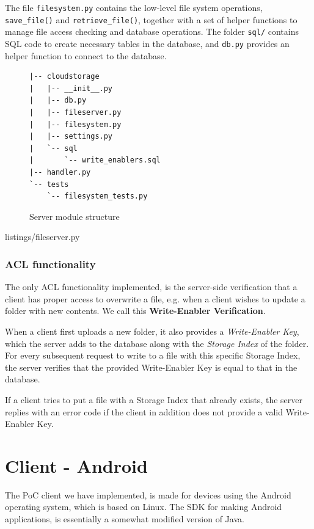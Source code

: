\documentclass[pdftex,english,10pt,b5paper,twoside]{book}
\begin{document}
The file \texttt{filesystem.py} contains the low-level file system operations,
\texttt{save\_file()} and \texttt{retrieve\_file()}, together with a set of
helper functions to manage file access checking and database operations.  The
folder \texttt{sql/} contains \ac{SQL} code to create necessary tables in the
database, and \texttt{db.py} provides an helper function to connect to the
database.

\begin{figure}[h!]
\begin{verbatim}
|-- cloudstorage
|   |-- __init__.py
|   |-- db.py
|   |-- fileserver.py
|   |-- filesystem.py
|   |-- settings.py
|   `-- sql
|       `-- write_enablers.sql
|-- handler.py
`-- tests
    `-- filesystem_tests.py
\end{verbatim}
    \caption{Server module structure}
    \label{fig:IM:layout}
\end{figure}


{listings/fileserver.py}

\subsubsection{\acs{ACL} functionality}

The only \ac{ACL} functionality implemented, is the server-side verification
that a client has proper access to overwrite a file, e.g. when a client wishes to
update a folder with new contents. We call this \textbf{Write-Enabler Verification}. 

When a client first uploads a new folder, it also provides a
\emph{Write-Enabler Key}, which the server adds to the database along with the
\emph{Storage Index} of the folder.  For every subsequent request to write to a
file with this specific Storage Index, the server verifies that the provided
Write-Enabler Key is equal to that in the database.

If a client tries to put a file with a Storage Index that already exists, the
server replies with an error code if the client in addition does not provide a
valid Write-Enabler Key.

\section{Client - Android}
%
The \ac{PoC} client we have implemented, is made for devices using the Android
operating system, which is based on Linux. The \ac{SDK} for making Android
applications, is essentially a somewhat modified version of Java. 
\end{document}
